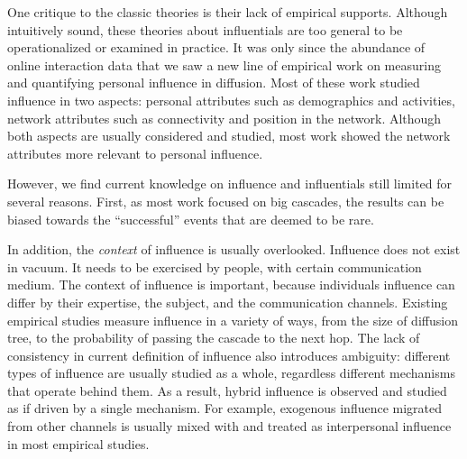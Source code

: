 \documentclass[phd,tocprelim]{cornell}
\begin{document}
One critique to the classic theories is their lack of empirical supports. Although intuitively sound, these theories about influentials are too general to be operationalized or examined in practice. It was only since the abundance of online interaction data that we saw a new line of empirical work on measuring and quantifying personal influence in diffusion. Most of these work studied influence in two aspects: personal attributes such as demographics and activities, network attributes such as connectivity and position in the network.  Although both aspects are usually considered and studied, most work showed the network attributes more relevant to personal influence\cite{Sun-2009,Bakshy-2011,Kempe-2003,kwak_10,Leskovec-EC-2006,Cha-2009}. 


However, we find current knowledge on influence and influentials still limited for several reasons. First, as most work focused on big cascades, the results can be biased towards the ``successful'' events that are deemed to be rare\cite{Bakshy-2011}.

In addition, the \emph{context} of influence is usually overlooked. Influence does not exist in vacuum. It needs to be exercised by people, with certain communication medium. The context of influence is important, because individuals influence can differ by their expertise\cite{Cha-2010}, the subject\cite{Leskovec-EC-2006}, and the communication channels\cite{Wu-Twitter-2011}. Existing empirical studies measure influence in a variety of ways, from the size of diffusion tree, to the probability of passing the cascade to the next hop. The lack of consistency in current definition of influence also introduces ambiguity: different types of influence are usually studied as a whole, regardless different mechanisms that operate behind them. As a result, hybrid influence is observed and studied as if driven by a single mechanism. For example, exogenous influence migrated from other channels is usually mixed with and treated as interpersonal influence in most empirical studies.
\end{document}
